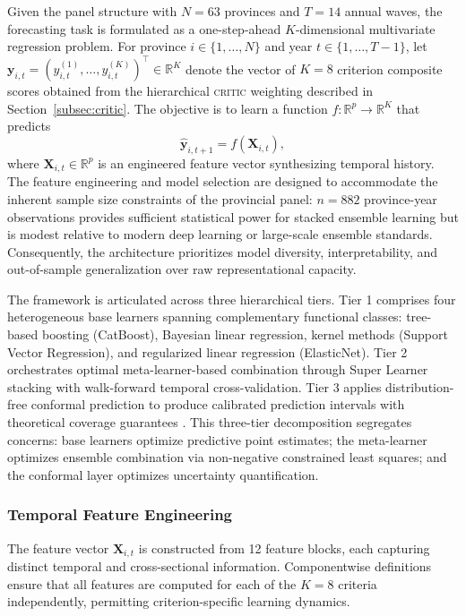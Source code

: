 \documentclass[12pt,a4paper]{article}
\newcommand{\CRITIC}{\textsc{critic}\xspace}
\begin{document}
Given the panel structure with $N = 63$ provinces and $T = 14$ annual waves, the forecasting task is formulated as a one-step-ahead $K$-dimensional multivariate regression problem. For province $i \in \{1, \ldots, N\}$ and year $t \in \{1, \ldots, T-1\}$, let $\mathbf{y}_{i,t} = (y_{i,t}^{(1)}, \ldots, y_{i,t}^{(K)})^\top \in \mathbb{R}^K$ denote the vector of $K = 8$ criterion composite scores obtained from the hierarchical \CRITIC weighting described in Section~\ref{subsec:critic}. The objective is to learn a function $f: \mathbb{R}^{p} \to \mathbb{R}^K$ that predicts
\begin{equation}
\label{eq:forecast_target}
\widehat{\mathbf{y}}_{i,t+1} = f\!\left(\mathbf{X}_{i,t}\right),
\end{equation}
where $\mathbf{X}_{i,t} \in \mathbb{R}^p$ is an engineered feature vector synthesizing temporal history. The feature engineering and model selection are designed to accommodate the inherent sample size constraints of the provincial panel: $n = 882$ province-year observations provides sufficient statistical power for stacked ensemble learning but is modest relative to modern deep learning or large-scale ensemble standards. Consequently, the architecture prioritizes model diversity, interpretability, and out-of-sample generalization over raw representational capacity.

The framework is articulated across three hierarchical tiers. Tier 1 comprises four heterogeneous base learners spanning complementary functional classes: tree-based boosting (CatBoost), Bayesian linear regression, kernel methods (Support Vector Regression), and regularized linear regression (ElasticNet). Tier 2 orchestrates optimal meta-learner-based combination through Super Learner stacking with walk-forward temporal cross-validation. Tier 3 applies distribution-free conformal prediction to produce calibrated prediction intervals with theoretical coverage guarantees \citep{Vovk2005, Barber2023}. This three-tier decomposition segregates concerns: base learners optimize predictive point estimates; the meta-learner optimizes ensemble combination via non-negative constrained least squares; and the conformal layer optimizes uncertainty quantification.

\subsubsection{Temporal Feature Engineering}

The feature vector $\mathbf{X}_{i,t}$ is constructed from 12 feature blocks, each capturing distinct temporal and cross-sectional information. Componentwise definitions ensure that all features are computed for each of the $K = 8$ criteria independently, permitting criterion-specific learning dynamics.
\end{document}
